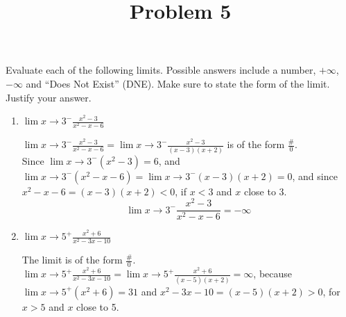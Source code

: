 \documentclass{ximera}
\title[Problem 5]{Problem 5}
\begin{document}
\begin{abstract} \end{abstract}
\maketitle


\begin{problem}
  Evaluate each of the following limits. Possible answers include a number, $+\infty$,  $-\infty$ and ``Does Not Exist'' (DNE).  Make sure to state the form of the limit.
 Justify your answer.

  \begin{enumerate}
	\item
      $\displaystyle \lim{x \to 3^-} \frac{x^2 - 3}{x^2 - x - 6}$
\begin{explanation} 

         $ \displaystyle \lim{x \to 3^-} \frac{x^2 - 3}{x^2 - x - 6} = \displaystyle \lim{x \to 3^-} \frac{x^2 - 3}{(x-3)(x+2)}$  is of the form $\frac{\#}{0}$.\\[1em]
Since  $ \displaystyle \lim{x \to 3^-} (x^2 - 3)=6$, and $ \displaystyle \lim{x \to 3^-} (x^2 - x - 6)= \displaystyle \lim{x \to 3^-} (x-3)(x+2)=0$, and since \\[1em]$x^2 - x - 6=(x-3)(x+2)<0$, if $x<3$ and $x$ close to 3.
	$$\displaystyle \lim{x \to 3^-} \frac{x^2 - 3}{x^2 - x - 6} =-\infty$$
      \end{explanation}

    \item
      $\displaystyle \lim{x \to 5^+} \frac{x^2 + 6}{x^2 - 3x - 10}$
\begin{explanation}
   The limit is of the form $\frac{\#}{0}$.\\[1em]
  
         $ \displaystyle \lim{x \to 5^+} \frac{x^2 + 6}{x^2 - 3x - 10} = \displaystyle \lim{x \to 5^+} \frac{x^2 + 6}{(x-5)(x+2)}  = \infty $,  because\\[1em]
 $\displaystyle \lim{x \to 5^+} (x^2 + 6)=31$ and  $ x^2 - 3x - 10= (x-5)(x+2)>0 $, for $x>5$ and $x$ close to 5.
 
      \end{explanation}


\end{enumerate}
\end{problem}
\end{document}
